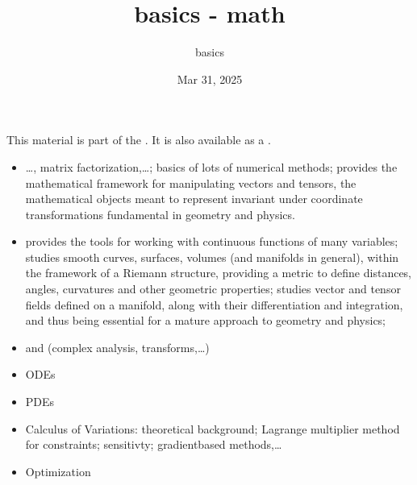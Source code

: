 \documentclass[letterpaper,10pt,english]{jupyterBook}
\title{basics - math}
\date{Mar 31, 2025}
\author{basics}
\begin{document}
\pagestyle{empty}
\sphinxmaketitle
\pagestyle{plain}
\sphinxtableofcontents
\pagestyle{normal}
\label{\detokenize{intro::doc}}


\sphinxAtStartPar
This material is part of the . It is also available as a .

\sphinxAtStartPar
{}
\begin{itemize}
\item {} 
\sphinxAtStartPar
{} …, matrix factorization,…; basics of lots of numerical methods;  provides the mathematical framework for manipulating vectors and tensors, the mathematical objects meant to represent  \sphinxhyphen{} invariant under coordinate transformations \sphinxhyphen{} fundamental in geometry and physics.

\item {} 
\sphinxAtStartPar
{} provides the tools for working with continuous functions of many variables;  studies smooth curves, surfaces, volumes (and manifolds in general), within the framework of a Riemann structure, providing a metric to define distances, angles, curvatures and other geometric properties;  studies vector and tensor fields defined on a manifold, along with their differentiation and integration, and thus being essential for a mature approach to geometry and physics;

\item {} 
\sphinxAtStartPar
{} and  (complex analysis, transforms,…)

\item {} 
\sphinxAtStartPar
ODEs

\item {} 
\sphinxAtStartPar
PDEs

\item {} 
\sphinxAtStartPar
Calculus of Variations: theoretical background; Lagrange multiplier method for constraints; sensitivty; gradient\sphinxhyphen{}based methods,…

\item {} 
\sphinxAtStartPar
Optimization

\end{itemize}
\end{document}
